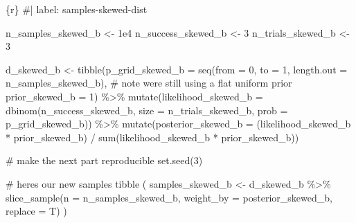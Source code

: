 \documentclass[
  letterpaper,
  DIV=11,
  numbers=noendperiod]{scrreprt}
\newenvironment{Shaded}{\begin{snugshade}}{\end{snugshade}}
\newcommand{\AttributeTok}[1]{\textcolor[rgb]{0.40,0.45,0.13}{#1}}
\newcommand{\CommentTok}[1]{\textcolor[rgb]{0.37,0.37,0.37}{#1}}
\newcommand{\DecValTok}[1]{\textcolor[rgb]{0.68,0.00,0.00}{#1}}
\newcommand{\FloatTok}[1]{\textcolor[rgb]{0.68,0.00,0.00}{#1}}
\newcommand{\FunctionTok}[1]{\textcolor[rgb]{0.28,0.35,0.67}{#1}}
\newcommand{\InformationTok}[1]{\textcolor[rgb]{0.37,0.37,0.37}{#1}}
\newcommand{\NormalTok}[1]{\textcolor[rgb]{0.00,0.23,0.31}{#1}}
\newcommand{\OtherTok}[1]{\textcolor[rgb]{0.00,0.23,0.31}{#1}}
\newcommand{\SpecialCharTok}[1]{\textcolor[rgb]{0.37,0.37,0.37}{#1}}
\begin{document}
\begin{Shaded}
\begin{Highlighting}[]
\InformationTok{\textasciigrave{}\textasciigrave{}\textasciigrave{}\{r\}}
\CommentTok{\#| label: samples{-}skewed{-}dist}

\NormalTok{n\_samples\_skewed\_b }\OtherTok{\textless{}{-}} \FloatTok{1e4}
\NormalTok{n\_success\_skewed\_b }\OtherTok{\textless{}{-}} \DecValTok{3}
\NormalTok{n\_trials\_skewed\_b  }\OtherTok{\textless{}{-}} \DecValTok{3}

\NormalTok{d\_skewed\_b }\OtherTok{\textless{}{-}}
\FunctionTok{tibble}\NormalTok{(}\AttributeTok{p\_grid\_skewed\_b =} \FunctionTok{seq}\NormalTok{(}\AttributeTok{from =} \DecValTok{0}\NormalTok{, }\AttributeTok{to =} \DecValTok{1}\NormalTok{, }\AttributeTok{length.out =}\NormalTok{ n\_samples\_skewed\_b),}
     \CommentTok{\# note we\textquotesingle{}re still using a flat uniform prior}
     \AttributeTok{prior\_skewed\_b  =} \DecValTok{1}\NormalTok{) }\SpecialCharTok{\%\textgreater{}\%} 
\FunctionTok{mutate}\NormalTok{(}\AttributeTok{likelihood\_skewed\_b =} \FunctionTok{dbinom}\NormalTok{(n\_success\_skewed\_b, }\AttributeTok{size =}\NormalTok{ n\_trials\_skewed\_b, }\AttributeTok{prob =}\NormalTok{ p\_grid\_skewed\_b)) }\SpecialCharTok{\%\textgreater{}\%} 
\FunctionTok{mutate}\NormalTok{(}\AttributeTok{posterior\_skewed\_b =}\NormalTok{ (likelihood\_skewed\_b }\SpecialCharTok{*}\NormalTok{ prior\_skewed\_b) }\SpecialCharTok{/} \FunctionTok{sum}\NormalTok{(likelihood\_skewed\_b }\SpecialCharTok{*}\NormalTok{ prior\_skewed\_b))}

\CommentTok{\# make the next part reproducible}
\FunctionTok{set.seed}\NormalTok{(}\DecValTok{3}\NormalTok{)}

\CommentTok{\# here\textquotesingle{}s our new samples tibble}
\NormalTok{(}
\NormalTok{  samples\_skewed\_b }\OtherTok{\textless{}{-}}
\NormalTok{    d\_skewed\_b }\SpecialCharTok{\%\textgreater{}\%} 
    \FunctionTok{slice\_sample}\NormalTok{(}\AttributeTok{n =}\NormalTok{ n\_samples\_skewed\_b, }\AttributeTok{weight\_by =}\NormalTok{ posterior\_skewed\_b, }\AttributeTok{replace =}\NormalTok{ T)}
\NormalTok{)}
\InformationTok{\textasciigrave{}\textasciigrave{}\textasciigrave{}}
\end{Highlighting}
\end{Shaded}
\end{document}
